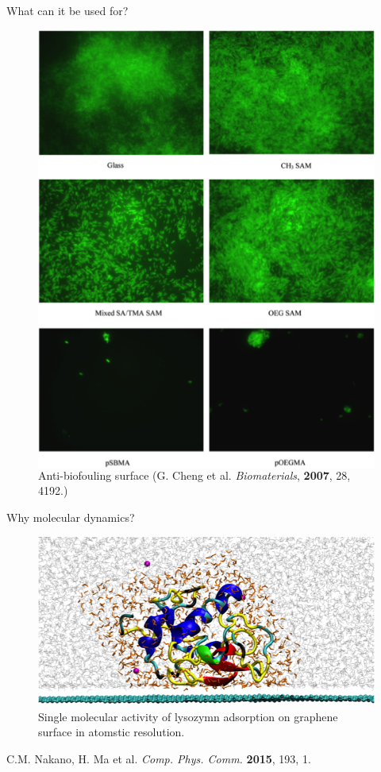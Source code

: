 \documentclass{beamer}
\begin{document}
\begin{frame}{What can it be used for?}
\begin{figure}
\begin{columns}
	\includegraphics[width=.9\linewidth]{Pics/foul.png}
	\caption{{\scriptsize Anti-biofouling surface} {\tiny (G. Cheng et al. \emph{Biomaterials}, \textbf{2007}, 28, 4192.)
}} 
\end{columns}	
\end{figure}
\end{frame}

\begin{frame}{Why molecular dynamics?}
\begin{figure}
	\includegraphics[width=\linewidth]{Pics/LYS.png}
	\caption{Single molecular activity of lysozymn adsorption on graphene surface in atomstic resolution.   }
\end{figure}
\hfill {\tiny C.M. Nakano, H. Ma et al. \emph{Comp. Phys. Comm.} \textbf{2015}, 193, 1. }
\end{frame}
\end{document}
